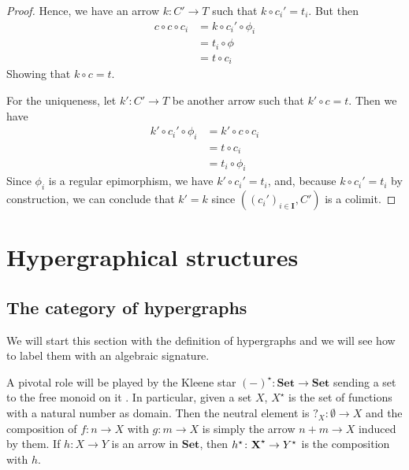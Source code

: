 \documentclass[runningheads,envcountsect]{llncs}
\newcommand{\cat}[1]{\ensuremath{\mathbf{#1}}}
\newcommand{\Set}{\mathbf{Set}}
\def\X{\textbf {\textup{X}}}
\begin{document}
\begin{proof}
    Hence, we have an arrow $k: C' \to T$ such that $k \circ c_i' = t_i$. But then
    \begin{align*}
        c \circ c \circ c_i &= k \circ c_i' \circ \phi_i \\
                            &= t_i \circ \phi \\
                            &= t \circ c_i
    \end{align*}
    Showing that $k \circ c = t$.

    For the uniqueness, let $k': C' \to T$ be another arrow such that $k' \circ c = t$. Then we have
    \begin{align*}
        k' \circ c_i' \circ \phi_i &= k' \circ c \circ c_i \\
                                   &= t \circ c_i \\
                                   &= t_i \circ \phi_i
    \end{align*}    
    Since $\phi_i$ is a regular epimorphism, we have $k' \circ c_i' = t_i$, and, because $k \circ c_i' = t_i$ by construction, we can conclude that $k'=k$ since $((c_i')_{i \in \cat I}, C')$ is a colimit.
\end{proof}

\fi





 



\section{Hypergraphical structures}

\subsection{The category of hypergraphs}


We will start this section with the definition of hypergraphs and we will see how to label them with an algebraic signature. 

A pivotal role will be played by the Kleene star $(-)^\star\colon \Set\to \Set$ sending a set to the free monoid on it \cite{...}. In particular, given a set $X$, $X^\star$ is the set of functions with a natural number as domain. Then the neutral element is $?_X\colon \emptyset \to X$ and the composition of $f\colon n\to X$ with $g\colon m\to X$ is simply the arrow $n+m\to X$ induced by them. If $h\colon X\to Y$ is an arrow in $\Set$, then $h^\star \colon \X^\star\to Y^\star$ is the composition with $h$.
\end{document}
